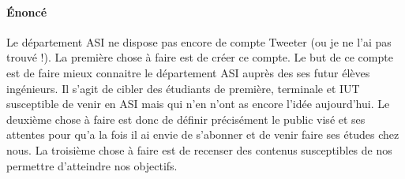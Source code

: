 \paragraph{Énoncé~~\\}
 Le département ASI ne dispose pas encore de compte Tweeter (ou je ne l'ai pas trouvé !). La première chose à faire est de créer ce compte. Le but de ce compte est de faire mieux connaitre le département ASI auprès des ses futur élèves ingénieurs. Il s'agit de cibler des étudiants de première, terminale et IUT susceptible de venir en ASI mais qui n'en n'ont as encore l'idée aujourd'hui. Le deuxième chose à faire est donc de définir précisément le public visé et ses attentes pour qu'a la fois il ai envie de s'abonner et de venir faire ses études chez nous. La troisième chose à faire est de recenser des contenus susceptibles de nos permettre d'atteindre nos objectifs.